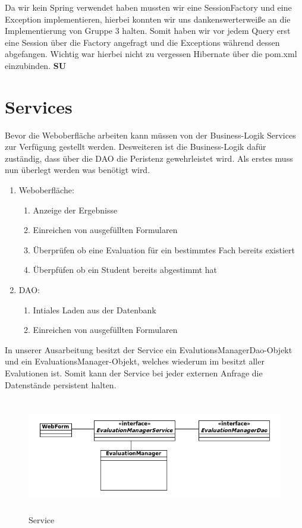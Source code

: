 \documentclass[titlepage, 12pt,a4paper]{scrartcl}
\begin{document}
Da wir kein Spring verwendet haben mussten wir eine SessionFactory und eine Exception implementieren,
hierbei konnten wir uns dankenswerterweiße an die Implementierung von Gruppe 3 halten. Somit haben
wir vor jedem Query erst eine Session über die Factory angefragt und die Exceptions während dessen 
abgefangen. Wichtig war hierbei nicht zu vergessen Hibernate über die pom.xml einzubinden.
{\bf{SU}}
\section{Services}
Bevor die Weboberfläche arbeiten kann müssen von der Business-Logik Services zur
Verfügung gestellt werden. Desweiteren ist die Business-Logik dafür zuständig, dass
über die DAO die Peristenz gewehrleistet wird. Als erstes muss nun überlegt werden
was benötigt wird.

\begin{enumerate}
\item Weboberfläche:
\begin{enumerate}
\item Anzeige der Ergebnisse
\item Einreichen von ausgefüllten Formularen
\item Überprüfen ob eine Evaluation für ein bestimmtes Fach bereits existiert
\item Überpfüfen ob ein Student bereits abgestimmt hat
\end{enumerate}

\item DAO:
\begin{enumerate}
\item Intiales Laden aus der Datenbank
\item Einreichen von ausgefüllten Formularen
\end{enumerate}
\end{enumerate}


In unserer Ausarbeitung besitzt der Service ein EvalutionsManagerDao-Objekt
und ein EvaluationsManager-Objekt, welches wiederum im besitzt aller Evalutionen ist.
Somit kann der Service bei jeder externen Anfrage die Datenstände persistent halten.

\begin{figure}[h]
\begin{center}
\includegraphics[width=15cm, height=5cm]{bilder/Service.png}
\caption{Service}
\label{service}
\end{center}
\end{figure}
\end{document}
